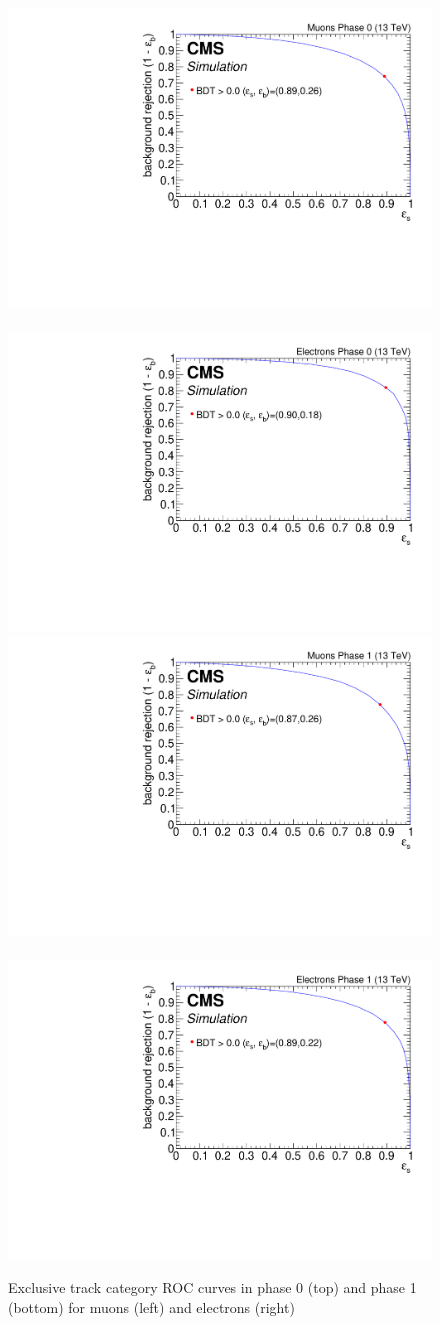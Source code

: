 \begin{figure}[!htb]
\centering
\includegraphics[width=0.48\linewidth]{plots/extrack_bdt/roc_Event_Ex_Track_Muons_Phase_0.pdf} \,
\includegraphics[width=0.48\linewidth]{plots/extrack_bdt/roc_Event_Ex_Track_Electrons_Phase_0.pdf} \\

\includegraphics[width=0.48\linewidth]{plots/extrack_bdt/roc_Event_Ex_Track_Muons_Phase_1.pdf} \,
\includegraphics[width=0.48\linewidth]{plots/extrack_bdt/roc_Event_Ex_Track_Electrons_Phase_1.pdf} \\

\caption[Exclusive track category ROC curve]{Exclusive track category ROC curves in phase 0 (top) and phase 1 (bottom) for muons (left) and electrons (right)}
\label{fig:event-bdt-ex-track-roc}
\end{figure}

